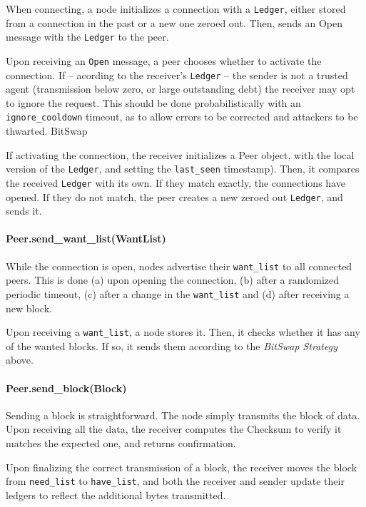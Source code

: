 \documentclass{sig-alternate}
\begin{document}
When connecting, a node initializes a connection with a
\texttt{Ledger}, either stored from a connection in the past or a new one
zeroed out. Then, sends an Open message with the \texttt{Ledger} to the peer.

Upon receiving an \texttt{Open} message, a peer chooses whether to activate
the connection. If -- acording to the receiver's \texttt{Ledger} -- the sender
is not a trusted agent (transmission below zero, or large outstanding debt) the
receiver may opt to ignore the request. This should be done probabilistically
with an \texttt{ignore\_cooldown} timeout, as to allow errors to be corrected
and attackers to be thwarted. BitSwap

If activating the connection, the receiver initializes a Peer object, with the
local version of the \texttt{Ledger}, and setting the \texttt{last\_seen}
timestamp). Then, it compares the received
\texttt{Ledger} with its own. If they match exactly, the connections have
opened. If they do not match, the peer creates a new zeroed out
\texttt{Ledger}, and sends it.


\paragraph{Peer.send\_want\_list(WantList)}

While the connection is open, nodes advertise their
\texttt{want\_list} to all connected peers. This is done (a) upon opening the
connection, (b) after a randomized periodic timeout, (c) after a change in
the \texttt{want\_list} and (d) after receiving a new block.

Upon receiving a \texttt{want\_list}, a node stores it. Then, it checks whether
it has any of the wanted blocks. If so, it sends them according to the
\textit{BitSwap Strategy} above.

\paragraph{Peer.send\_block(Block)}

Sending a block is straightforward. The node simply transmits the block of
data. Upon receiving all the data, the receiver computes the Checksum to
verify it matches the expected one, and returns confirmation.

Upon finalizing the correct transmission of a block, the receiver moves the
block from \texttt{need\_list} to \texttt{have\_list}, and both the receiver
and sender update their ledgers to reflect the additional bytes transmitted.
\end{document}
